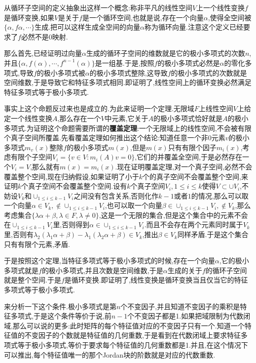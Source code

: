 从循环子空间的定义抽象出这样一个概念:称非平凡的线性空间$V$上一个线性变换$f$是循环变换,如果$V$是关于$f$是一个循环空间,也就是说,存在一个向量$\alpha$,使得全空间被$\{\alpha,f\alpha,\cdots\}$生成.把可以这样生成全空间的向量$\alpha$称为循环向量.注意这个定义已经要求了$f$必然不是0映射.

那么首先,已经证明过向量$\alpha$生成的循环子空间的维数就是它的极小多项式的次数$n$,并且$\{\alpha,f(\alpha),\cdots,f^{n-1}(\alpha)\}$是一组基.于是,按照$f$的极小多项式必然是$\alpha$的零化多项式,导致$f$的极小多项式被$\alpha$的极小多项式整除,这导致$f$的极小多项式的次数就是空间维数,于是导致它和特征多项式相同.即证明了,线性空间上的循环变换必然满足特征多项式等于极小多项式.

事实上这个命题反过来也是成立的.为此来证明一个定理.无限域$F$上线性空间$V$上给定一个线性变换$A$,那么存在一个$V$中元素,它关于$A$的极小多项式恰好就是$A$的极小多项式.为证明这个命题需要所谓的\textbf{覆盖定理}:一个无限域上的线性空间,不会被有限个真子空间所覆盖.先看覆盖定理如何推出这个结论:知道任意一个非0元素$v$的极小多项式$m_v(x)$整除$f$的极小多项式$m(x)$,但是$m(x)$只有有限个因子$m_i(x)$,考虑有限个子空间$V_i=\{v\in V:m_i(A)v=0\}$,它们的并覆盖全空间,于是必然存在一个$V_i=V$,那么就有$m(x)=m_i(x)$.现在证明覆盖定理,对一个真子空间,必然不会覆盖整个空间,现在归纳假设,如果证明了小于$k$个的真子空间不会覆盖整个空间,来证明$k$个真子空间不会覆盖整个空间.设有$k$个真子空间$V_i,1\le i\le k$使得$V\subset\cup V_i$,不妨设$V_{k}$和$\cup_{1\le i\le k-1}V_i$之间没有包含关系,否则化作$k-1$或者$1$的情况,那么可以取一个向量$\alpha\in V_k,\not\in\cup_{1\le i\le k-1}V_i$,也可以取一个向量$\beta\in\cup_{1\le i\le k-1}V_i,\not\in V_k$,那么考虑集合$\{\lambda\alpha+\beta,\lambda\in F,\lambda\not=0\}$,这是一个无限的集合,但是这个集合中的元素不会在$\cup_ {1\le i\le k-1}V_i$里,否则得到$\alpha\in\cup_{1\le i\le k-1}V_i$.而且不会存在两个元素同时属于$V_k$里,否则有$\lambda_2(\lambda_1\alpha+\beta)-\lambda_1(\lambda_2\alpha+\beta)\in V_k$,推出$\beta\in V_k$同样矛盾.于是这个集合只有有限个元素,矛盾.

于是按照这个定理,当特征多项式等于极小多项式的时候,存在一个向量$\alpha$,它的极小多项式就是$f$的极小多项式,并且次数是空间维数,于是$\alpha$生成的关于$f$的循环子空间就是整个空间.于是$f$是循环变换.即证明了,线性变换是循环变换当且仅当它的特征多项式等于极小多项式.

来分析一下这个条件.极小多项式是第$n$个不变因子,并且知道不变因子的乘积是特征多项式,于是这个条件等价于说,前$n-1$个不变因子都是1.如果把域限制为代数闭域,那么可以说的更多:此时矩阵的每个特征值对应的不变因子只有一个.知道一个特征值的不变因子的个数就是特征值的几何重数,于是看到在代数闭域上要求特征多项式等于极小多项式,等价于要求每个特征值的几何重数都是1.并且,在这个情况下可以推出,每个特征值唯一的那个Jordan块的阶数就是对应的代数重数.

